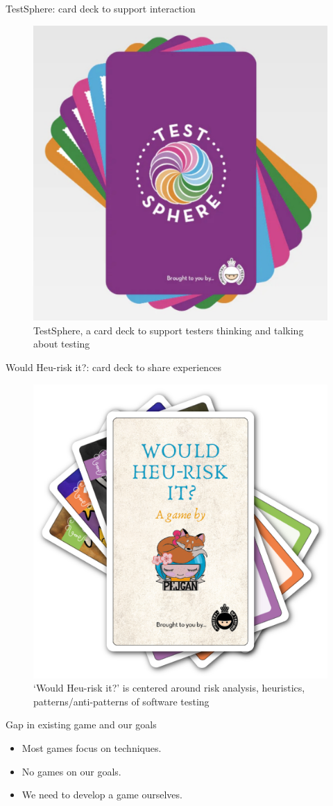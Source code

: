\documentclass[aspectratio=169]{beamer}
\begin{document}
\begin{frame}{TestSphere: card deck to support interaction}
\begin{figure}
    \centering
    \includegraphics[width=0.5\linewidth]{images//games/testsphere}
    \caption{TestSphere, a card deck to support testers thinking and talking about testing}
\end{figure}
\end{frame}

\begin{frame}{Would Heu-risk it?: card deck to share experiences}
\begin{figure}
    \centering
    \includegraphics[width=0.5\linewidth]{images//games/would}
    \caption{`Would Heu-risk it?' is centered around risk analysis, heuristics, patterns/anti-patterns of software testing}
\end{figure}
\end{frame}

\begin{frame}{Gap in existing game and our goals}
    \begin{itemize}
        \item Most games focus on techniques.
        \item No games on our goals.
        \item We need to develop a game ourselves.
    \end{itemize}
\end{frame}
\end{document}
